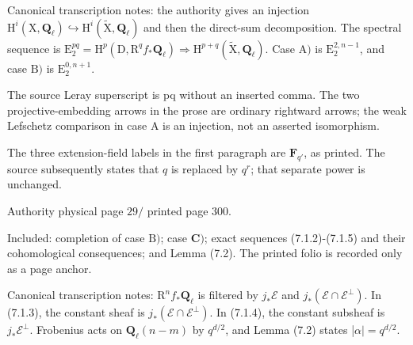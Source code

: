 \documentclass[10pt,leqno]{article}
\begin{document}
\noindent Canonical transcription notes: the authority gives an injection \(\mathrm{H}^{i}(\mathrm{X},\mathbf{Q}_{\ell })\hookrightarrow \mathrm{H}^{i}(\widetilde{\mathrm{X}},\mathbf{Q}_{\ell })\) and then the direct-sum decomposition. The spectral sequence is \(\mathrm{E}_{2}^{pq}=\mathrm{H}^{p}(\mathrm{D},\mathrm{R}^{q} f_{*}\mathbf{Q}_{\ell })\Rightarrow \mathrm{H}^{p+q}(\widetilde{\mathrm{X}},\mathbf{Q}_{\ell })\). Case \(\mathrm{A})\) is \(\mathrm{E}_{2}^{2,n- 1}\), and case \(\mathrm{B})\) is \(\mathrm{E}_{2}^{0,n+1}\).\par

\noindent The source Leray superscript is pq without an inserted comma. The two projective-embedding arrows in the prose are ordinary rightward arrows; the weak Lefschetz comparison in case \(\mathrm{A}\) is an injection, not an asserted isomorphism.\par

\noindent The three extension-field labels in the first paragraph are \(\mathbf{F}_{q'}\), as printed. The source subsequently states that \(q\) is replaced by \(q^{r}\); that separate power is unchanged.\par

\clearpage

\label{physical-29}\par\smallskip

\noindent Authority physical page \(29 /\) printed page 300.\par

\noindent Included: completion of case \(\mathrm{B})\); case \(\mathbf{C})\); exact sequences (7.1.2)-(7.1.5) and their cohomological consequences; and Lemma (7.2). The printed folio is recorded only as a page anchor.\par

\noindent Canonical transcription notes: \(\mathrm{R}^{n} f_{*}\mathbf{Q}_{\ell }\) is filtered by \(j_{*}\mathcal{E} \) and \(j_{*}(\mathcal{E} \cap \mathcal{E} ^{\perp })\). In (7.1.3), the constant sheaf is \(j_{*}(\mathcal{E} \cap \mathcal{E} ^{\perp })\). In (7.1.4), the constant subsheaf is \(j_{*}\mathcal{E} ^{\perp }\). Frobenius acts on \(\mathbf{Q}_{\ell }(n- m)\) by \(q^{d/2}\), and Lemma (7.2) states |\(\alpha |=q^{d/2}\).\par

\clearpage

\label{physical-30}\par\smallskip
\end{document}
